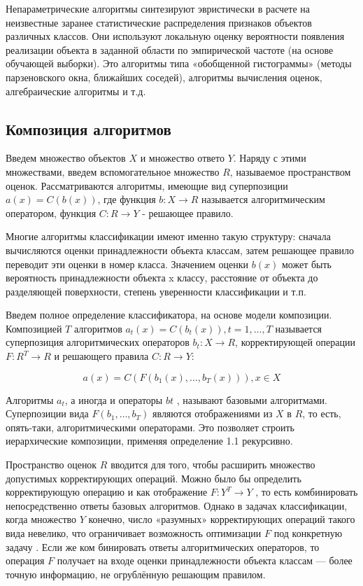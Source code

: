 Непараметрические алгоритмы синтезируют эвристически в расчете на неизвестные заранее статистические распределения признаков объектов различных классов. Они используют локальную оценку вероятности появления реализации объекта в заданной области по эмпирической частоте (на основе обучающей выборки). Это алгоритмы типа «обобщенной гистограммы» (методы парзеновского окна, ближайших соседей), алгоритмы вычисления оценок, алгебраические алгоритмы и т.д.

\subsection{Композиция алгоритмов}
Введем множество объектов $X$ и множество ответо $Y$. Наряду с этими множествами, введем вспомогательное множество $R$, называемое пространством оценок. Рассматриваются алгоритмы, имеющие вид суперпозиции $a(x)=C(b(x))$, где функция $b: X \to R$ называется алгоритмическим оператором, функция $C: R \to Y$ - решающее правило. 

Многие алгоритмы классификации имеют именно такую структуру: сначала вычисляются оценки принадлежности объекта классам, затем решающее правило переводит эти оценки в номер класса. Значением оценки $b(x)$ может быть вероятность принадлежности объекта x классу, расстояние от объекта до разделяющей поверхности, степень уверенности классификации и т.п.

Введем полное определение классификатора, на основе модели композиции. Композицией $T$ алгоритмов $a_t(x)= C(b_t(x)), t=1,\dotsc,T$ называется суперпозиция алгоритмических операторов $b_t: X \to R$, корректирующей операции  $F: R^T \to R$ и решающего правила $C: R \to Y$:


\begin{equation}
	a(x) = C(F(b_1(x),\dotsc,b_T(x))), x \in X
\end{equation}

Алгоритмы $a_t$, а иногда и операторы $bt$ , называют базовыми алгоритмами. 
Суперпозиции вида $F(b_1,\dotsc, b_T)$ являются отображениями из $X$ в $R$, то есть, опять-таки, алгоритмическими операторами. Это позволяет строить иерархические композиции, применяя определение 1.1 рекурсивно.

Пространство оценок $R$ вводится для того, чтобы расширить множество допустимых корректирующих операций. Можно было бы определить корректирующую операцию и как отображение $F: Y^T \to Y$ , то есть комбинировать непосредственно ответы базовых алгоритмов. Однако в задачах классификации, когда множество $Y$ конечно, число «разумных» корректирующих операций такого вида невелико, что ограничивает возможность оптимизации $F$ под конкретную задачу \todobiography. Если же ком бинировать ответы алгоритмических операторов, то операция $F$ получает на входе оценки принадлежности объекта классам — более точную информацию, не огрублённую решающим правилом.

